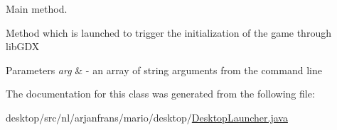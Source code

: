 Main method. 

Method which is launched to trigger the initialization of the game through lib\+G\+DX 
\begin{DoxyParams}{Parameters}
{\em arg} & -\/ an array of string arguments from the command line \\
\hline
\end{DoxyParams}


The documentation for this class was generated from the following file\+:\begin{DoxyCompactItemize}
\item 
desktop/src/nl/arjanfrans/mario/desktop/\hyperlink{DesktopLauncher_8java}{Desktop\+Launcher.\+java}\end{DoxyCompactItemize}

